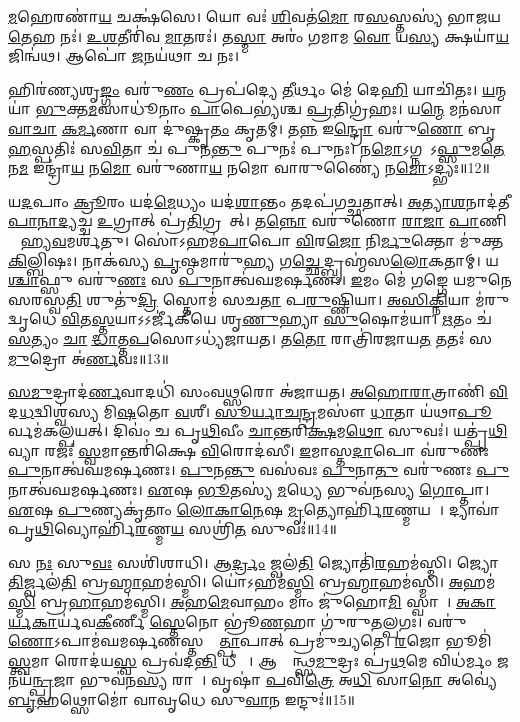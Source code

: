  \ul{𑌮}𑌹𑍇𑌰𑌣𑌾॑\ul{𑌯} 𑌚𑌕𑍍𑌷॑𑌸𑍇। 
 𑌯𑍋 𑌵𑌃॑ \ul{𑌶𑌿}𑌵𑌤॑\ul{𑌮𑍋} 𑌰\ul{𑌸}𑌸𑍍𑌤𑌸𑍍𑌯॑ 𑌭𑌾𑌜𑌯\ul{𑌤𑍇}𑌹 𑌨𑌃॑। 
 \ul{𑌉}\ul{𑌶}𑌤𑍀𑌰𑌿॑𑌵 \ul{𑌮𑌾}𑌤𑌰𑌃॑। 
 𑌤\ul{𑌸𑍍𑌮𑌾} 𑌅𑌰𑌂॑ 𑌗𑌮𑌾𑌮 \ul{𑌵𑍋} 𑌯\ul{𑌸𑍍𑌯} 𑌕𑍍𑌷𑌯𑌾॑\ul{𑌯} 𑌜𑌿𑌨𑍍𑌵॑𑌥। 
 𑌆𑌪𑍋॑ \ul{𑌜}𑌨𑌯॑𑌥𑌾 𑌚 𑌨𑌃।

 
𑌹𑌿𑌰॑𑌣𑍍𑌯𑌶𑍃\ul{𑌙𑍍𑌗𑌂} 𑌵𑌰𑍁॑\ul{𑌣𑌂} 𑌪𑍍𑌰𑌪॑𑌦𑍍𑌯𑍇 \ul{𑌤𑍀}𑌰𑍍𑌥𑌂 𑌮𑍇॑ 𑌦𑍇\ul{𑌹𑌿} 𑌯𑌾𑌚𑌿॑𑌤𑌃। 
\ul{𑌯}𑌨𑍍𑌮𑌯𑌾॑ \ul{𑌭𑍁}𑌕𑍍𑌤\ul{𑌮}𑌸𑌾𑌧𑍂॑𑌨𑌾𑌂 \ul{𑌪𑌾}𑌪𑍇𑌭𑍍𑌯॑𑌶𑍍𑌚 \ul{𑌪𑍍𑌰}𑌤𑌿𑌗𑍍𑌰॑𑌹𑌃। 
𑌯\ul{𑌨𑍍𑌮𑍇} 𑌮𑌨॑𑌸𑌾 \ul{𑌵𑌾}\ul{𑌚𑌾} \ul{𑌕}\ul{𑌰𑍍𑌮}𑌣𑌾 𑌵𑌾 𑌦𑍁॑𑌷𑍍𑌕𑍃\ul{𑌤𑌂} 𑌕𑍃𑌤𑌮𑍍। 
𑌤\ul{𑌨𑍍𑌨} 𑌇\ul{𑌨𑍍𑌦𑍍𑌰𑍋} 𑌵𑌰𑍁॑\ul{𑌣𑍋} 𑌬𑍃\ul{𑌹}𑌸𑍍𑌪𑌤𑌿𑌃॑ 𑌸\ul{𑌵𑌿}𑌤𑌾 𑌚॑ 𑌪𑍁𑌨\ul{𑌨𑍍𑌤𑍁} 𑌪𑍁𑌨𑌃॑ 𑌪𑍁𑌨𑌃। 
𑌨\ul{𑌮𑍋}𑌽𑌗𑍍𑌨𑌯𑍇᳚𑌽\ul{𑌫𑍍𑌸𑍁}𑌮\ul{𑌤𑍇} 𑌨\ul{𑌮} 𑌇𑌨𑍍𑌦𑍍𑌰𑌾॑\ul{𑌯} 𑌨\ul{𑌮𑍋} 𑌵𑌰𑍁॑𑌣𑌾\ul{𑌯} 𑌨𑌮𑍋 𑌵𑌾𑌰𑍁𑌣𑍍𑌯𑍈॑ 𑌨\ul{𑌮𑍋}𑌽𑌦𑍍𑌭𑍍𑌯𑌃॥12॥

 𑌯\ul{𑌦}𑌪𑌾𑌂 \ul{𑌕𑍍𑌰𑍂}𑌰𑌂 𑌯𑌦॑\ul{𑌮𑍇}𑌧𑍍𑌯𑌂 𑌯𑌦॑\ul{𑌶𑌾}𑌨𑍍𑌤𑌂 𑌤𑌦𑌪॑𑌗𑌚𑍍𑌛𑌤𑌾𑌤𑍍। 
 \ul{𑌅}\ul{𑌤𑍍𑌯𑌾}\ul{𑌶}𑌨𑌾𑌦॑𑌤𑍀\-\ul{𑌪𑌾}\ul{𑌨𑌾}\ul{𑌦𑍍𑌯}𑌚𑍍𑌚 \ul{𑌉}𑌗𑍍𑌰𑌾𑌤𑍍 𑌪𑍍𑌰॑\ul{𑌤𑌿}𑌗𑍍𑌰𑌹𑌾᳚𑌤𑍍। 
 𑌤\ul{𑌨𑍍𑌨𑍋} 𑌵𑌰𑍁॑𑌣𑍋 \ul{𑌰𑌾}\ul{𑌜𑌾} \ul{𑌪𑌾}𑌣𑌿𑌨𑌾᳚ 𑌹𑍍𑌯\ul{𑌵}𑌮𑌰𑍍\mbox{}𑌶॑𑌤𑍁। 
 𑌸𑍋॑𑌽𑌹𑌮॑\ul{𑌪𑌾}𑌪𑍋 \ul{𑌵𑌿}𑌰\ul{𑌜𑍋} 𑌨𑌿\ul{𑌰𑍍𑌮𑍁}𑌕𑍍𑌤𑍋 𑌮𑍁॑𑌕𑍍𑌤\ul{𑌕𑌿}𑌲𑍍𑌬𑌿𑌷𑌃। 
 𑌨𑌾𑌕॑𑌸𑍍𑌯 \ul{𑌪𑍃}𑌷𑍍𑌠𑌮𑌾𑌰𑍁॑\ul{𑌹𑍍𑌯} 𑌗\ul{𑌚𑍍𑌛𑍇}𑌦𑍍𑌬𑍍𑌰𑌹𑍍𑌮॑𑌸\ul{𑌲𑍋}𑌕𑌤𑌾𑌮𑍍। 
 𑌯\ul{𑌶𑍍𑌚𑌾}𑌫𑍍𑌸𑍁 𑌵𑌰𑍁॑\ul{𑌣𑌃} 𑌸 \ul{𑌪𑍁}𑌨𑌾𑌤𑍍𑌵॑𑌘𑌮𑌰𑍍\mbox{}\ul{𑌷}𑌣𑌃। 
 \ul{𑌇}𑌮𑌂 𑌮𑍇॑ 𑌗𑌙𑍍𑌗𑍇 𑌯𑌮𑍁𑌨𑍇 𑌸𑌰𑌸𑍍𑌵\ul{𑌤𑌿} 𑌶𑍁𑌤𑍁॑\ul{𑌦𑍍𑌰𑌿} 𑌸𑍍𑌤𑍋𑌮॑ 𑌸𑌚\ul{𑌤𑌾} 𑌪\ul{𑌰𑍁}𑌷𑍍𑌣𑌿𑌯𑌾। 
 \ul{𑌅}\ul{𑌸𑌿}\ul{𑌕𑍍𑌨𑌿}𑌯𑌾 𑌮॑𑌰𑍁𑌦𑍍\mbox{}𑌵𑍃𑌧𑍇 \ul{𑌵𑌿}𑌤\ul{𑌸𑍍𑌤}𑌯𑌾𑌽𑌽𑌰𑍍𑌜𑍀॑𑌕𑍀𑌯𑍇 𑌶𑍃\ul{𑌣𑍁}𑌹𑍍𑌯𑌾 \ul{𑌸𑍁}𑌷𑍋𑌮॑𑌯𑌾। 
 \ul{𑌋}𑌤𑌂 𑌚॑ \ul{𑌸}𑌤𑍍𑌯𑌂 \ul{𑌚𑌾}𑌭𑍀᳚\ul{𑌦𑍍𑌧𑌾}𑌤𑍍𑌤\ul{𑌪}𑌸𑍋𑌽𑌧𑍍𑌯॑𑌜𑌾𑌯𑌤। 
 𑌤\ul{𑌤𑍋} 𑌰𑌾𑌤𑍍𑌰𑌿॑𑌰𑌜𑌾𑌯\ul{𑌤} 𑌤𑌤𑌃॑ 𑌸\ul{𑌮𑍁}𑌦𑍍𑌰𑍋 𑌅॑\ul{𑌰𑍍𑌣}𑌵𑌃॥13॥
 
 \ul{𑌸}\ul{𑌮𑍁}𑌦𑍍𑌰𑌾𑌦॑\ul{𑌰𑍍𑌣}𑌵𑌾𑌦𑌧𑌿॑ 𑌸𑌂𑌵\ul{𑌥𑍍𑌸}𑌰𑍋 𑌅॑𑌜𑌾𑌯𑌤। 
 \ul{𑌅}\ul{𑌹𑍋}\ul{𑌰𑌾}𑌤𑍍𑌰𑌾𑌣𑌿॑ \ul{𑌵𑌿}𑌦\ul{𑌧}𑌦𑍍𑌵𑌿𑌶𑍍𑌵॑𑌸𑍍𑌯 𑌮𑌿\ul{𑌷}𑌤𑍋 \ul{𑌵}𑌶𑍀। 
 \ul{𑌸𑍂}\ul{𑌰𑍍𑌯𑌾}\ul{𑌚}\ul{𑌨𑍍𑌦𑍍𑌰}𑌮𑌸𑍗॑ \ul{𑌧𑌾}𑌤𑌾 𑌯॑𑌥𑌾\ul{𑌪𑍂}𑌰𑍍𑌵𑌮॑𑌕𑌲𑍍𑌪𑌯𑌤𑍍। 
 𑌦𑌿𑌵𑌂॑ 𑌚 𑌪𑍃\ul{𑌥𑌿}𑌵𑍀𑌂 \ul{𑌚𑌾}𑌨𑍍𑌤𑌰𑌿॑\ul{𑌕𑍍𑌷}𑌮\ul{𑌥𑍋} 𑌸𑍁𑌵𑌃॑। 
 𑌯𑌤𑍍𑌪𑍃॑\ul{𑌥𑌿}𑌵𑍍𑌯𑌾 𑌰𑌜𑌃॑ \ul{𑌸𑍍𑌵}𑌮𑌾𑌨𑍍𑌤𑌰𑌿॑𑌕𑍍𑌷𑍇 \ul{𑌵𑌿}𑌰𑍋𑌦॑𑌸𑍀। 
 \ul{𑌇}𑌮𑌾𑌸𑍍𑌤\ul{𑌦𑌾}𑌪𑍋 𑌵॑𑌰𑍁𑌣𑌃 \ul{𑌪𑍁}𑌨𑌾𑌤𑍍𑌵॑𑌘𑌮𑌰𑍍\mbox{}\ul{𑌷}𑌣𑌃। 
 \ul{𑌪𑍁}𑌨\ul{𑌨𑍍𑌤𑍁} 𑌵𑌸॑𑌵𑌃 \ul{𑌪𑍁}𑌨𑌾\ul{𑌤𑍁} 𑌵𑌰𑍁॑𑌣𑌃 \ul{𑌪𑍁}𑌨𑌾𑌤𑍍𑌵॑𑌘𑌮𑌰𑍍\mbox{}\ul{𑌷}𑌣𑌃। 
 \ul{𑌏}𑌷 \ul{𑌭𑍂}𑌤𑌸𑍍𑌯॑ \ul{𑌮}𑌧𑍍𑌯𑍇 𑌭𑍁𑌵॑𑌨𑌸𑍍𑌯 \ul{𑌗𑍋}𑌪𑍍𑌤𑌾। 
 \ul{𑌏}𑌷 \ul{𑌪𑍁}𑌣𑍍𑌯𑌕𑍃॑𑌤𑌾𑌂 \ul{𑌲𑍋}\ul{𑌕𑌾}\ul{𑌨𑍇}𑌷 \ul{𑌮𑍃}𑌤𑍍𑌯𑍋𑌰𑍍\mbox{}𑌹𑌿॑\ul{𑌰}𑌣𑍍𑌮𑌯𑌮𑍍᳚। 
 𑌦𑍍𑌯𑌾𑌵𑌾॑𑌪𑍃\ul{𑌥𑌿}𑌵𑍍𑌯𑍋𑌰𑍍\mbox{}𑌹𑌿॑\ul{𑌰}𑌣𑍍𑌮\ul{𑌯}\ul{} 𑌸𑌶𑍍𑌰𑌿॑\ul{𑌤}\ul{} 𑌸𑍁𑌵𑌃॑॥14॥

𑌸 \ul{𑌨𑌃} 𑌸𑍁\ul{𑌵𑌃} 𑌸𑌶𑌿॑𑌶𑌾𑌧𑌿। 
𑌆\ul{𑌰𑍍𑌦𑍍𑌰𑌂} 𑌜𑍍𑌵𑌲॑\ul{𑌤𑌿} 𑌜𑍍𑌯𑍋𑌤𑌿॑\ul{𑌰}𑌹𑌮॑𑌸𑍍𑌮𑌿। 
𑌜𑍍𑌯𑍋\ul{𑌤𑌿}𑌰𑍍𑌜𑍍𑌵𑌲॑\ul{𑌤𑌿} 𑌬𑍍𑌰\ul{𑌹𑍍𑌮𑌾}𑌹𑌮॑𑌸𑍍𑌮𑌿। 
𑌯𑍋॑𑌽𑌹𑌮॑\ul{𑌸𑍍𑌮𑌿} 𑌬𑍍𑌰\ul{𑌹𑍍𑌮𑌾}𑌹𑌮॑𑌸𑍍𑌮𑌿। 
\ul{𑌅}𑌹𑌮॑\ul{𑌸𑍍𑌮𑌿} 𑌬𑍍𑌰\ul{𑌹𑌾}𑌹𑌮॑𑌸𑍍𑌮𑌿। 
\ul{𑌅}𑌹\ul{𑌮𑍇}𑌵𑌾𑌹𑌂 𑌮𑌾𑌂 𑌜𑍁॑𑌹𑍋\ul{𑌮𑌿} 𑌸𑍍𑌵𑌾𑌹𑌾᳚। 
\ul{𑌅}\ul{𑌕𑌾}\ul{𑌰𑍍𑌯}\ul{𑌕𑌾}𑌰𑍍𑌯॑𑌵\ul{𑌕𑍀}𑌰𑍍𑌣𑍀 \ul{𑌸𑍍𑌤𑍇}𑌨𑍋 𑌭𑍍𑌰𑍂॑\ul{𑌣}𑌹𑌾 𑌗𑍁॑𑌰𑍁\ul{𑌤}𑌲𑍍𑌪𑌗𑌃। 
𑌵𑌰𑍁॑\ul{𑌣𑍋}𑌽𑌪𑌾𑌮॑𑌘\-𑌮𑌰𑍍\mbox{}\ul{𑌷}𑌣𑌸𑍍𑌤𑌸𑍍𑌮𑌾᳚\ul{𑌤𑍍𑌪𑌾}𑌪𑌾𑌤𑍍 𑌪𑍍𑌰𑌮𑍁॑𑌚𑍍𑌯𑌤𑍇। 
\ul{𑌰}𑌜𑍋 𑌭𑍂𑌮𑌿॑\ul{𑌸𑍍𑌤𑍍𑌵}𑌮𑌾 𑌰𑍋𑌦॑𑌯\ul{𑌸𑍍𑌵} 𑌪𑍍𑌰𑌵॑𑌦\ul{𑌨𑍍𑌤𑌿} 𑌧𑍀𑌰𑌾𑌃᳚। 
𑌆𑌕𑍍𑌰𑌾᳚𑌨𑍍𑌥𑍍𑌸\ul{𑌮𑍁}𑌦𑍍𑌰𑌃 𑌪𑍍𑌰॑\ul{𑌥}𑌮𑍇 𑌵𑌿𑌧॑𑌰𑍍𑌮𑌂 \ul{𑌜}𑌨𑌯॑\ul{𑌨𑍍𑌪𑍍𑌰}𑌜𑌾 𑌭𑍁𑌵॑𑌨\ul{𑌸𑍍𑌯} 𑌰𑌾𑌜𑌾᳚। 
𑌵𑍃𑌷𑌾॑ \ul{𑌪}𑌵𑌿\ul{𑌤𑍍𑌰𑍇} 𑌅\ul{𑌧𑌿} 𑌸𑌾\ul{𑌨𑍋} 𑌅𑌵𑍍𑌯𑍇॑ \ul{𑌬𑍃}𑌹𑌥𑍍𑌸𑍋𑌮𑍋॑ 𑌵𑌾𑌵𑍃𑌧𑍇 𑌸𑍁\ul{𑌵𑌾}𑌨 𑌇𑌨𑍍𑌦𑍁𑌃॑॥15॥
\anuvakamend

